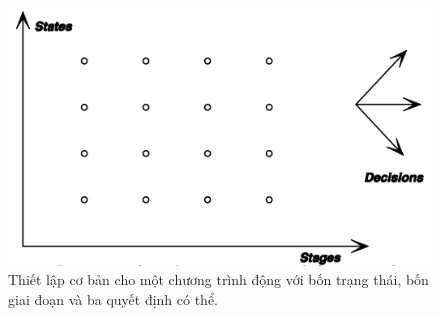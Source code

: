 \documentclass[12pt,a4paper]{report}
\begin{document}
	\newline
	\begin{figure}[h]
		\centering
		\includegraphics[scale=.8]{hinh1.png}
		\caption{Thiết lập cơ bản cho một chương trình động với bốn trạng thái, bốn giai đoạn và ba quyết định có thể.}                  
	\end{figure}
\end{document}
